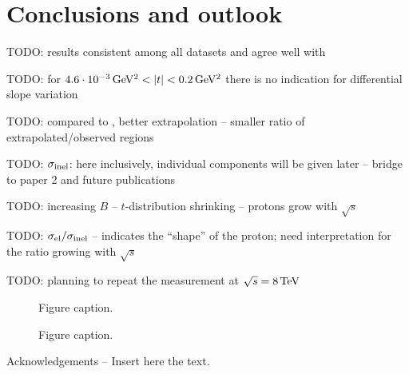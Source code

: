 \documentclass[doublecol]{../macros/epl2}
\def\un#1{\,{\rm #1}}
\begin{document}
\section{Conclusions and outlook}

TODO: results consistent among all datasets and agree well with \cite{epl96}

TODO: for $4.6\cdot10^{-3}\un{GeV^2} < |t| < 0.2\un{GeV^2}$ there is no indication for differential slope variation

TODO: compared to \cite{epl96}, better extrapolation -- smaller ratio of extrapolated/observed regions

TODO: $\sigma_{\rm inel}$: here inclusively, individual components will be given later -- bridge to paper 2 and future publications

TODO: increasing $B$ -- $t$-distribution shrinking -- protons grow with $\sqrt s$

TODO: $\sigma_{\rm el} / \sigma_{\rm inel}$ -- indicates the ``shape'' of the proton; need interpretation for the ratio growing with $\sqrt s$

TODO: planning to repeat the measurement at $\sqrt s = 8\un{TeV}$



\begin{figure}
\caption{Figure caption.}
\label{fig.1}
\end{figure}

\begin{figure}
\caption{Figure caption.}
\label{fig.1}
\end{figure}




\acknowledgments
Acknowledgements -- Insert here the text.


\begin{thebibliography}{0}




%

\end{thebibliography}
\end{document}

